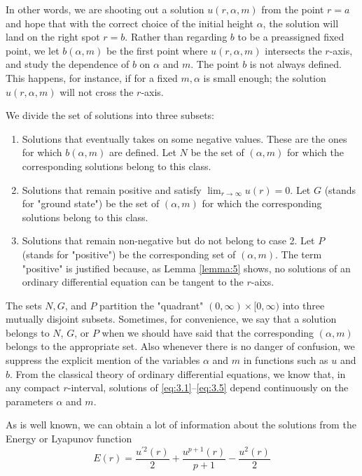 In other words, we are shooting out a solution $u(r, \alpha, m)$ from the point $r=a$
and hope that with the correct choice of the initial height $\alpha$,
the solution will land on the right spot $r=b$.
Rather than regarding $b$ to be a preassigned fixed point,
we let $b(\alpha, m)$ be the first point where $u(r, \alpha, m)$ intersects the
$r$-axis, and study the dependence of $b$ on $\alpha$ and $m$.
The point $b$ is not always defined. This happens, for instance, 
if for a fixed $m, \alpha$ is small enough; the solution $u(r, \alpha, m)$ will 
not cross the $r$-axis.

We divide the set of solutions into three subsets:
\begin{enumerate}
  \item Solutions that eventually takes on some negative values.
    These are the ones for which $b(\alpha, m)$ are defined.
    Let $N$ be the set of $(\alpha, m)$ for which the corresponding
    solutions belong to this class.
  \item Solutions that remain positive and satisfy
    $\lim _{r \rightarrow \infty} u(r)=0$. Let $G$ (stands for "ground state")
    be the set of $(\alpha, m)$ for which the corresponding solutions
    belong to this class.
  \item Solutions that remain non-negative but do not belong to case 2.
    Let $P$ (stands for "positive") be the corresponding set of $(\alpha, m)$.
    The term "positive" is justified because, as Lemma \ref{lemma:5} shows,
    no solutions of an ordinary differential equation can be tangent to the $r$-aixs.
\end{enumerate}

The sets $N, G$, and $P$ partition the "quadrant" $(0, \infty) \times[0, \infty)$
into three
mutually disjoint subsets. Sometimes, for convenience,
we say that a solution belongs to $N$,
$G$, or $P$ when we should have said that the corresponding $(\alpha, m)$ belongs to the
appropriate set. Also whenever there is no danger of confusion, we suppress the explicit
mention of the variables $\alpha$ and $m$ in functions such as $u$ and $b$.
From the classical theory of ordinary differential equations, we know that,
in any compact $r$-interval, solutions
of \eqref{eq:3.1}--\eqref{eq:3.5} depend continuously on the parameters $\alpha$ and $m$.

As is well known, we can obtain a lot of information about the solutions
from the Energy or Lyapunov function
\begin{equation}\label{eq:3.6}
  E(r)=\frac{u^{\prime 2}(r)}{2}+\frac{u^{p+1}(r)}{p+1}-\frac{u^2(r)}{2}  
\end{equation}

